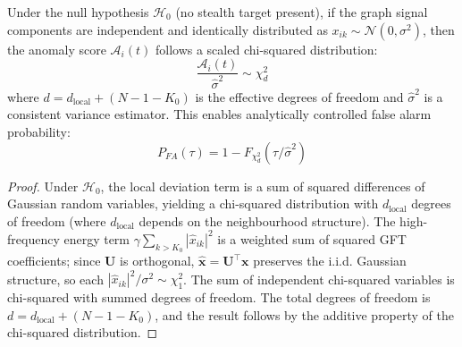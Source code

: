 \documentclass[sensors,article,submit,pdftex]{mdpi}
\newcommand{\vect}[1]{\boldsymbol{#1}}
\newcommand{\mat}[1]{\mathbf{#1}}
\begin{document}
\begin{theorem}
\label{thm:anomaly}
Under the null hypothesis $\mathcal{H}_0$ (no stealth target present), if the graph signal components are independent and identically distributed as $x_{ik} \sim \mathcal{N}(0, \sigma^2)$, then the anomaly score $\mathcal{A}_i(t)$ follows a scaled chi-squared distribution:
\begin{equation}
    \frac{\mathcal{A}_i(t)}{\hat{\sigma}^2} \sim \chi^2_d
    \label{eq:chi2}
\end{equation}
where $d = d_{\text{local}} + (N - 1 - K_0)$ is the effective degrees of freedom and $\hat{\sigma}^2$ is a consistent variance estimator. This enables analytically controlled false alarm probability:
\begin{equation}
    P_{FA}(\tau) = 1 - F_{\chi^2_d}(\tau / \hat{\sigma}^2)
    \label{eq:pfa_chi2}
\end{equation}
\end{theorem}
\begin{proof}
Under $\mathcal{H}_0$, the local deviation term is a sum of squared differences of Gaussian random variables, yielding a chi-squared distribution with $d_{\text{local}}$ degrees of freedom (where $d_{\text{local}}$ depends on the neighbourhood structure). The high-frequency energy term $\gamma \sum_{k>K_0} |\hat{x}_{ik}|^2$ is a weighted sum of squared GFT coefficients; since $\mat{U}$ is orthogonal, $\hat{\vect{x}} = \mat{U}^\top \vect{x}$ preserves the i.i.d. Gaussian structure, so each $|\hat{x}_{ik}|^2 / \sigma^2 \sim \chi^2_1$. The sum of independent chi-squared variables is chi-squared with summed degrees of freedom. The total degrees of freedom is $d = d_{\text{local}} + (N - 1 - K_0)$, and the result follows by the additive property of the chi-squared distribution.
\end{proof}
\end{document}
